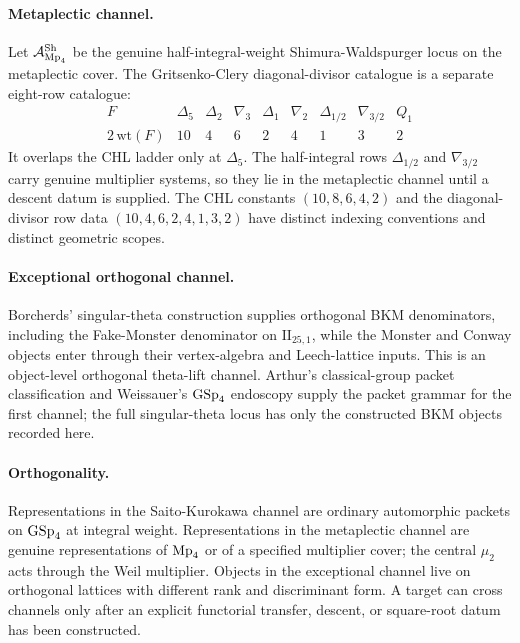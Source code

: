 \paragraph{Metaplectic channel.}
Let $\mathcal{A}^{\mathrm{Sh}}_{\mathrm{Mp}_4}$ be the genuine half-integral-weight
Shimura-Waldspurger locus on the metaplectic cover. The
Gritsenko-Clery diagonal-divisor catalogue is a separate eight-row
catalogue:
\[
\begin{array}{c|cccccccc}
F & \Delta_5 & \Delta_2 & \nabla_3 & \Delta_1
  & \nabla_2 & \Delta_{1/2} & \nabla_{3/2} & Q_1\\ \hline
2\,\mathrm{wt}(F) & 10 & 4 & 6 & 2 & 4 & 1 & 3 & 2
\end{array}
\]
It overlaps the CHL ladder only at $\Delta_5$. The half-integral rows
$\Delta_{1/2}$ and $\nabla_{3/2}$ carry genuine multiplier systems, so
they lie in the metaplectic channel until a descent datum is supplied.
The CHL constants $(10,8,6,4,2)$ and the diagonal-divisor row data
$(10,4,6,2,4,1,3,2)$ have distinct indexing conventions and distinct
geometric scopes.

\paragraph{Exceptional orthogonal channel.}
Borcherds' singular-theta construction supplies orthogonal BKM
denominators, including the Fake-Monster denominator on
$\mathrm{II}_{25,1}$, while the Monster and Conway objects enter through
their vertex-algebra and Leech-lattice inputs. This is an object-level
orthogonal theta-lift channel. Arthur's classical-group packet
classification and Weissauer's $\mathrm{GSp}_4$ endoscopy supply the packet
grammar for the first channel; the full singular-theta locus has only the
constructed BKM objects recorded here.

\paragraph{Orthogonality.}
Representations in the Saito-Kurokawa channel are ordinary automorphic
packets on $\mathrm{GSp}_4$ at integral weight. Representations in the
metaplectic channel are genuine representations of $\mathrm{Mp}_4$ or of a
specified multiplier cover; the central $\mu_2$ acts through the Weil
multiplier. Objects in the exceptional channel live on orthogonal lattices
with different rank and discriminant form. A target can cross channels
only after an explicit functorial transfer, descent, or square-root datum
has been constructed.

